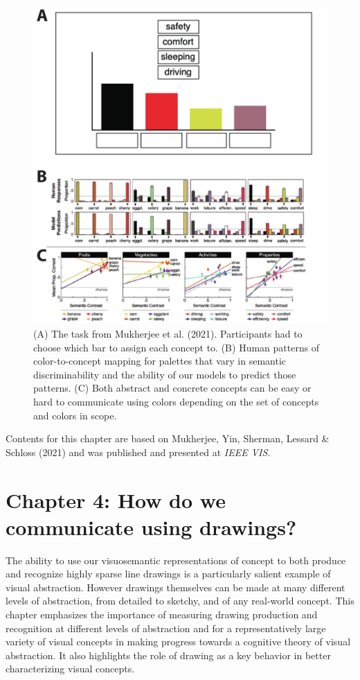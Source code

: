 \documentclass{Dissertate}
\begin{document}
\begin{figure}[htpb!]
    \centering
    \includegraphics[width=.8\linewidth]{proposal/figures/chap3.pdf}
    \caption{(A) The task from Mukherjee et al. (2021). Participants had to choose which bar to assign each concept to. (B) Human patterns of color-to-concept mapping for palettes that vary in semantic discriminability and the ability of our models to predict those patterns. (C) Both abstract and concrete concepts can be easy or hard to communicate using colors depending on the set of concepts and colors in scope. }
    \label{fig:chap3}
\end{figure}




\begin{tcolorbox}[
    colback=gray!10,  %
    colframe=black!50, %
    arc=4mm,         %
    boxrule=2pt      %
]
Contents for this chapter are based on Mukherjee, Yin, Sherman, Lessard \& Schloss (2021) and was published and presented at \textit{IEEE VIS}.
\end{tcolorbox}

\section*{Chapter 4: How do we communicate using drawings?}

The ability to use our visuosemantic representations of concept to both produce and recognize highly sparse line drawings is a particularly salient example of visual abstraction.
However drawings themselves can be made at many different levels of abstraction, from detailed to sketchy, and of any real-world concept.
This chapter emphasizes the importance of measuring drawing production and recognition at different levels of abstraction and for a representatively large variety of visual concepts in making progress towards a cognitive theory of visual abstraction.
It also highlights the role of drawing as a key behavior in better characterizing visual concepts.
\end{document}

